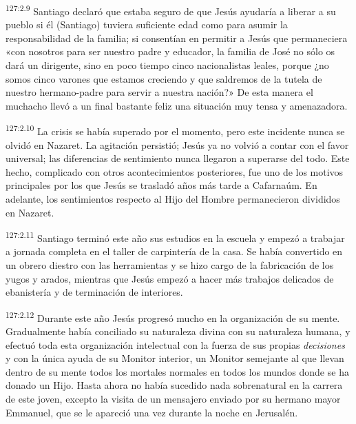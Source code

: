 \par
\textsuperscript{127:2.9} Santiago declaró que estaba seguro de que Jesús ayudaría a liberar a su pueblo si él (Santiago) tuviera suficiente edad como para asumir la responsabilidad de la familia; si consentían en permitir a Jesús que permaneciera «con nosotros para ser nuestro padre y educador, la familia de José no sólo os dará un dirigente, sino en poco tiempo cinco nacionalistas leales, porque ¿no somos cinco varones que estamos creciendo y que saldremos de la tutela de nuestro hermano-padre para servir a nuestra nación?» De esta manera el muchacho llevó a un final bastante feliz una situación muy tensa y amenazadora.

\par
\textsuperscript{127:2.10} La crisis se había superado por el momento, pero este incidente nunca se olvidó en Nazaret. La agitación persistió; Jesús ya no volvió a contar con el favor universal; las diferencias de sentimiento nunca llegaron a superarse del todo. Este hecho, complicado con otros acontecimientos posteriores, fue uno de los motivos principales por los que Jesús se trasladó años más tarde a Cafarnaúm. En adelante, los sentimientos respecto al Hijo del Hombre permanecieron divididos en Nazaret.

\par
\textsuperscript{127:2.11} Santiago terminó este año sus estudios en la escuela y empezó a trabajar a jornada completa en el taller de carpintería de la casa. Se había convertido en un obrero diestro con las herramientas y se hizo cargo de la fabricación de los yugos y arados, mientras que Jesús empezó a hacer más trabajos delicados de ebanistería y de terminación de interiores.

\par
\textsuperscript{127:2.12} Durante este año Jesús progresó mucho en la organización de su mente. Gradualmente había conciliado su naturaleza divina con su naturaleza humana, y efectuó toda esta organización intelectual con la fuerza de sus propias \textit{decisiones} y con la única ayuda de su Monitor interior, un Monitor semejante al que llevan dentro de su mente todos los mortales normales en todos los mundos donde se ha donado un Hijo. Hasta ahora no había sucedido nada sobrenatural en la carrera de este joven, excepto la visita de un mensajero enviado por su hermano mayor Emmanuel, que se le apareció una vez durante la noche en Jerusalén.

